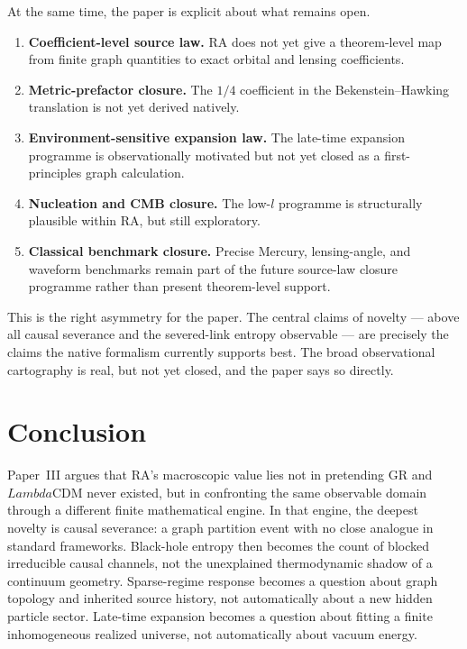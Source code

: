 \documentclass[11pt]{article}
\def\ell{l}%
\def\Lambda{Lambda}%
\begin{document}
At the same time, the paper is explicit about what remains open.
\begin{enumerate}[nosep]
    \item \textbf{Coefficient-level source law.} RA does not yet give a theorem-level map from finite graph quantities to exact orbital and lensing coefficients.
    \item \textbf{Metric-prefactor closure.} The $1/4$ coefficient in the Bekenstein--Hawking translation is not yet derived natively.
    \item \textbf{Environment-sensitive expansion law.} The late-time expansion programme is observationally motivated but not yet closed as a first-principles graph calculation.
    \item \textbf{Nucleation and CMB closure.} The low-$\ell$ programme is structurally plausible within RA, but still exploratory.
    \item \textbf{Classical benchmark closure.} Precise Mercury, lensing-angle, and waveform benchmarks remain part of the future source-law closure programme rather than present theorem-level support.
\end{enumerate}

This is the right asymmetry for the paper. The central claims of novelty --- above all causal severance and the severed-link entropy observable --- are precisely the claims the native formalism currently supports best. The broad observational cartography is real, but not yet closed, and the paper says so directly.

\section{Conclusion}

Paper~III argues that RA's macroscopic value lies not in pretending GR and $\Lambda$CDM never existed, but in confronting the same observable domain through a different finite mathematical engine. In that engine, the deepest novelty is causal severance: a graph partition event with no close analogue in standard frameworks. Black-hole entropy then becomes the count of blocked irreducible causal channels, not the unexplained thermodynamic shadow of a continuum geometry. Sparse-regime response becomes a question about graph topology and inherited source history, not automatically about a new hidden particle sector. Late-time expansion becomes a question about fitting a finite inhomogeneous realized universe, not automatically about vacuum energy.
\end{document}
